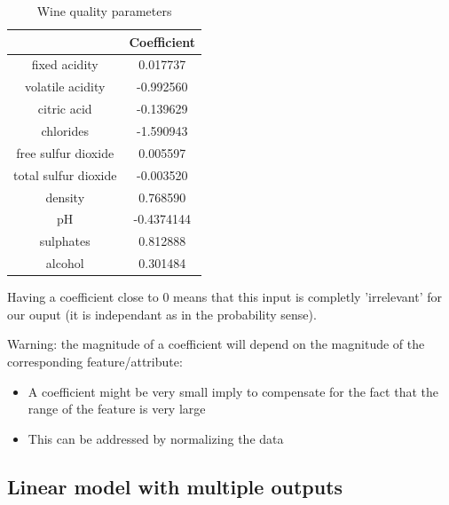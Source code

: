 	\begin{table}[h!]
\centering
\begin{tabular}{|c|c|}
\hline
 & Coefficient \\
\hline
\hline
	fixed acidity & 0.017737 \\
\hline
	volatile acidity & -0.992560 \\
\hline
	citric acid & -0.139629 \\
\hline
	chlorides & -1.590943 \\
\hline
	free sulfur dioxide & 0.005597 \\
\hline
	total sulfur dioxide & -0.003520 \\
\hline
	density & 0.768590 \\
\hline
	pH & -0.4374144 \\
\hline
	sulphates & 0.812888 \\
\hline
	alcohol & 0.301484 \\
\hline
\end{tabular}
\caption{Wine quality parameters}
\end{table}
Having a coefficient close to 0 means that this input is completly 'irrelevant' for our ouput (it is independant as in the probability sense).
\begin{framedremark}
Warning: the magnitude of a coefficient will depend on the magnitude of the corresponding feature/attribute:
\begin{itemize}
	\item A coefficient might be very small imply to compensate for the fact that the range of the feature is very large
	\item This can be addressed by normalizing the data
\end{itemize}

\end{framedremark}

	
\subsection{Linear model with multiple outputs}

